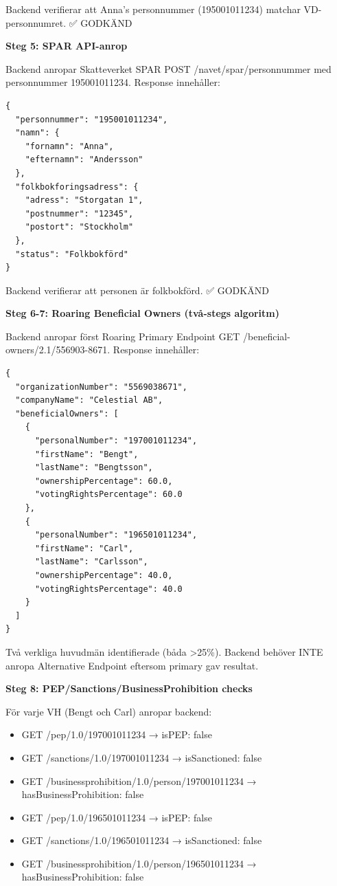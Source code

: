 Backend verifierar att Anna's personnummer (195001011234) matchar VD-personnumret. ✅ GODKÄND

\textbf{Steg 5: SPAR API-anrop}

Backend anropar Skatteverket SPAR POST /navet/spar/personnummer med personnummer 195001011234. Response innehåller:
\begin{lstlisting}
{
  "personnummer": "195001011234",
  "namn": {
    "fornamn": "Anna",
    "efternamn": "Andersson"
  },
  "folkbokforingsadress": {
    "adress": "Storgatan 1",
    "postnummer": "12345",
    "postort": "Stockholm"
  },
  "status": "Folkbokförd"
}
\end{lstlisting}

Backend verifierar att personen är folkbokförd. ✅ GODKÄND

\textbf{Steg 6-7: Roaring Beneficial Owners (två-stegs algoritm)}

Backend anropar först Roaring Primary Endpoint GET /beneficial-owners/2.1/556903-8671. Response innehåller:
\begin{lstlisting}
{
  "organizationNumber": "5569038671",
  "companyName": "Celestial AB",
  "beneficialOwners": [
    {
      "personalNumber": "197001011234",
      "firstName": "Bengt",
      "lastName": "Bengtsson",
      "ownershipPercentage": 60.0,
      "votingRightsPercentage": 60.0
    },
    {
      "personalNumber": "196501011234",
      "firstName": "Carl",
      "lastName": "Carlsson",
      "ownershipPercentage": 40.0,
      "votingRightsPercentage": 40.0
    }
  ]
}
\end{lstlisting}

Två verkliga huvudmän identifierade (båda >25\%). Backend behöver INTE anropa Alternative Endpoint eftersom primary gav resultat.

\textbf{Steg 8: PEP/Sanctions/BusinessProhibition checks}

För varje VH (Bengt och Carl) anropar backend:
\begin{itemize}[noitemsep]
  \item GET /pep/1.0/197001011234 → isPEP: false
  \item GET /sanctions/1.0/197001011234 → isSanctioned: false
  \item GET /businessprohibition/1.0/person/197001011234 → hasBusinessProhibition: false
  \item GET /pep/1.0/196501011234 → isPEP: false
  \item GET /sanctions/1.0/196501011234 → isSanctioned: false
  \item GET /businessprohibition/1.0/person/196501011234 → hasBusinessProhibition: false
\end{itemize}


